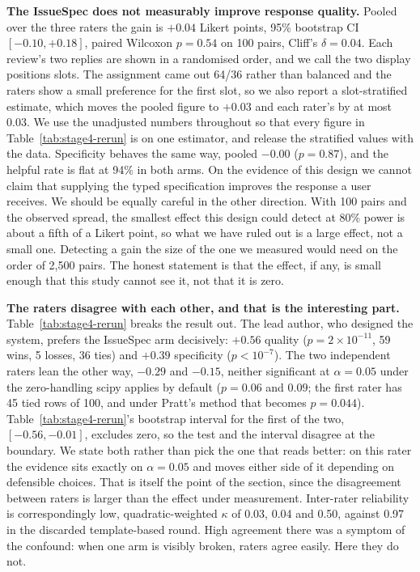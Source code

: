 \documentclass[preprint,12pt]{elsarticle}
\begin{document}
\textbf{The IssueSpec does not measurably improve response quality.} Pooled over the three raters the gain is $+0.04$ Likert points, 95\% bootstrap CI
$[-0.10, +0.18]$, paired Wilcoxon $p = 0.54$ on 100 pairs, Cliff's $\delta = 0.04$. Each review's two replies are shown in a randomised order, and we call the two display positions
slots. The assignment came out 64/36 rather than balanced and the raters show a small preference
for the first slot,
so we also report a slot-stratified estimate, which moves the pooled figure to $+0.03$ and each
rater's by at most 0.03. We use the unadjusted numbers throughout so that every figure in
Table~\ref{tab:stage4-rerun} is on one estimator, and release the stratified values with the
data.
Specificity behaves the same way, pooled $-0.00$ ($p = 0.87$), and the helpful rate is flat at
94\% in both arms. On the evidence of this design we cannot claim that supplying the typed
specification improves the response a user receives. We should be equally careful in the other
direction. With 100 pairs and the observed spread, the smallest effect this design could detect
at 80\% power is about a fifth of a Likert point, so what we have ruled out is a large effect,
not a small one. Detecting a gain the size of the one we measured would need on the order of
2{,}500 pairs. The honest statement is that the effect, if any, is small enough that this study
cannot see it, not that it is zero.

\textbf{The raters disagree with each other, and that is the interesting part.}
Table~\ref{tab:stage4-rerun} breaks the result out. The lead author, who designed the system,
prefers the IssueSpec arm decisively: $+0.56$ quality ($p = 2 \times 10^{-11}$, 59 wins, 5
losses, 36 ties) and $+0.39$ specificity ($p < 10^{-7}$). The two independent raters lean the
other way, $-0.29$ and $-0.15$, neither significant at $\alpha = 0.05$ under the zero-handling
scipy applies by default ($p = 0.06$ and $0.09$; the first rater has 45 tied rows of 100, and
under Pratt's method that becomes $p = 0.044$). Table~\ref{tab:stage4-rerun}'s bootstrap interval
for the first of the two, $[-0.56, -0.01]$, excludes zero, so the test and the interval disagree
at the boundary. We state both rather than pick the one that reads better: on this rater the
evidence sits exactly on $\alpha = 0.05$ and moves either side of it depending on defensible
choices. That is itself the point of the section, since the disagreement between raters is larger
than the effect under measurement.
Inter-rater reliability is correspondingly low, quadratic-weighted $\kappa$ of 0.03, 0.04 and
0.50, against 0.97 in the discarded template-based round. High agreement there was a symptom of
the confound: when one arm is visibly broken, raters agree easily. Here they do not.
\end{document}
